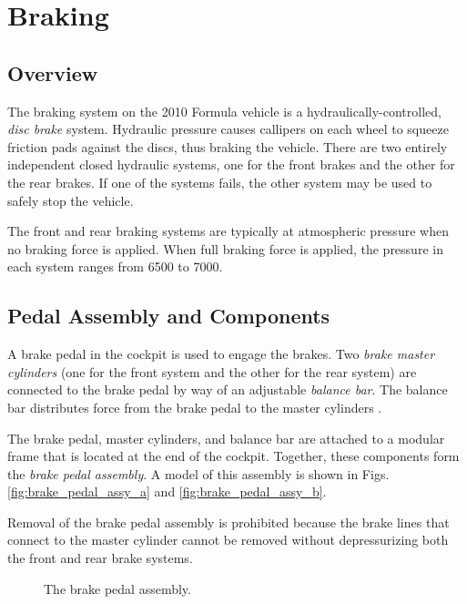 \section{Braking}

\subsection{Overview}

The braking system on the 2010 Formula vehicle is a hydraulically-controlled, \emph{disc brake} system. Hydraulic pressure causes callipers on each wheel to squeeze friction pads against the discs, thus braking the vehicle. There are two entirely independent closed hydraulic systems, one for the front brakes and the other for the rear brakes. If one of the systems fails, the other system may be used to safely stop the vehicle.

The front and rear braking systems are typically at atmospheric pressure when no braking force is applied. When full braking force is applied, the pressure in each system ranges from 6500 to \unit{7000}{\kilo\pascal}.

\subsection{Pedal Assembly and Components}

A brake pedal in the cockpit is used to engage the brakes. Two \emph{brake master cylinders} (one for the front system and the other for the rear system) are connected to the brake pedal by way of an adjustable \emph{balance bar}. The balance bar distributes force from the brake pedal to the master cylinders \cite{TiltonBrakeBias}. 

The brake pedal, master cylinders, and balance bar are attached to a modular frame that is located at the end of the cockpit. Together, these components form the \emph{brake pedal assembly}. A model of this assembly is shown in Figs. \ref{fig:brake_pedal_assy_a} and \ref{fig:brake_pedal_assy_b}. 

Removal of the brake pedal assembly is prohibited because the brake lines that connect to the master cylinder cannot be removed without depressurizing both the front and rear brake systems. 

\begin{figure}[h!]
	\centering
    \caption{The brake pedal assembly.}
    \label{fig:brake_pedal_assy}
\end{figure}

